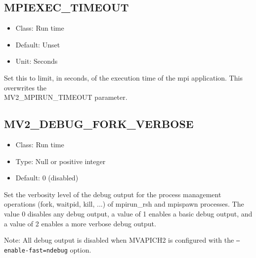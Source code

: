 \subsection{MPIEXEC\_TIMEOUT}
\label{def:mpiexec-timeout}
\begin{itemize}
    \item Class: Run time
    \item Default: Unset
    \item Unit: Seconds
\end{itemize}
Set this to limit, in seconds, of the execution time of the mpi application.
This overwrites the \\ MV2\_MPIRUN\_TIMEOUT parameter.

\subsection{MV2\_DEBUG\_FORK\_VERBOSE}
\label{def:mpiexec-timeout}
\begin{itemize}
    \item Class: Run time
    \item Type: Null or positive integer
    \item Default: 0 (disabled)
\end{itemize}

Set the verbosity level of the debug output for the process management operations (fork, waitpid, kill, ...) of mpirun\_rsh and mpispawn processes. The value 0 disables any debug output, a value of 1 enables a basic debug output, and a value of 2 enables a more verbose debug output.

Note: All debug output is disabled when MVAPICH2 is configured with the \texttt{--enable-fast=ndebug} option.



